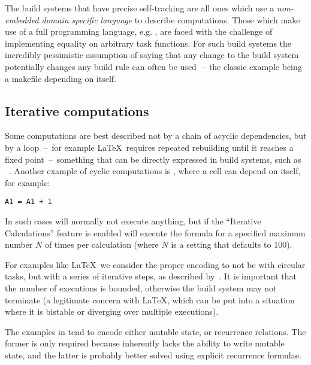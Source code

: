 The build systems that have precise self-tracking are all ones which use a
\emph{non-embedded domain specific language} to describe computations.
Those which make use of a full programming language, e.g. \Shake, are faced with
the challenge of implementing equality on arbitrary task functions. For such
build systems the incredibly pessimistic assumption of saying that any change to
the build system potentially changes any build rule can often be used~--~the
classic example being a makefile depending on itself.

\subsection{Iterative computations}\label{sec-iterative-compute}

Some computations are best described not by a chain of acyclic dependencies,
but by a loop~--~for example \LaTeX~requires repeated rebuilding until it
reaches a fixed point~--~something that can be directly expressed in build
systems, such as \Pluto~\cite{erdweg2015pluto}. Another example of cyclic
computations is \Excel, where a cell can depend on itself, for example:

\begin{verbatim}
A1 = A1 + 1
\end{verbatim}

\noindent
In such cases \Excel will normally not execute anything, but if the
``Iterative Calculations'' feature is enabled will execute the formula for a
specified maximum number $N$ of times per calculation (where $N$ is a
setting that defaults to 100).

For examples like \LaTeX~we consider the proper encoding to not be with circular
tasks, but with a series of iterative steps, as described
by~\citet{shake-fixed-point}. It is important that the number of executions is
bounded, otherwise the build system may not terminate (a legitimate concern
with \LaTeX, which can be put into a situation where it is bistable or diverging
over multiple executions).

The examples in \Excel tend to encode either mutable state, or recurrence
relations. The former is only required because \Excel inherently lacks the
ability to write mutable state, and the latter is probably better solved using
explicit recurrence formulae.

